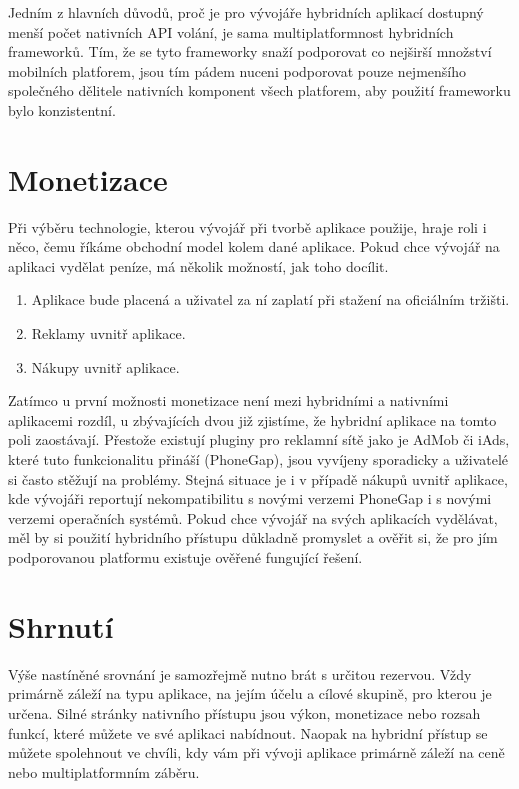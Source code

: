 Jedním z hlavních důvodů, proč je pro vývojáře hybridních aplikací dostupný menší počet nativních API volání, je sama multiplatformnost hybridních frameworků. Tím, že se tyto frameworky snaží podporovat co nejširší množství mobilních platforem, jsou tím pádem nuceni podporovat pouze nejmenšího společného dělitele nativních komponent všech platforem, aby použití frameworku bylo konzistentní.

\section{Monetizace}
Při výběru technologie, kterou vývojář při tvorbě aplikace použije, hraje roli i něco, čemu říkáme obchodní model kolem dané aplikace. Pokud chce vývojář na aplikaci vydělat peníze, má několik možností, jak toho docílit.

\begin{enumerate}
	\item Aplikace bude placená a uživatel za ní zaplatí při stažení na oficiálním tržišti.
	\item Reklamy uvnitř aplikace.
	\item Nákupy uvnitř aplikace.
\end{enumerate}

Zatímco u první možnosti monetizace není mezi hybridními a nativními aplikacemi rozdíl, u zbývajících dvou již zjistíme, že hybridní aplikace na tomto poli zaostávají. Přestože existují pluginy pro reklamní sítě jako je AdMob či iAds, které tuto funkcionalitu přináší (PhoneGap), jsou vyvíjeny sporadicky a uživatelé si často stěžují na problémy. Stejná situace je i v případě nákupů uvnitř aplikace, kde vývojáři reportují nekompatibilitu s novými verzemi PhoneGap i s novými verzemi operačních systémů. Pokud chce vývojář na svých aplikacích vydělávat, měl by si použití hybridního přístupu důkladně promyslet a ověřit si, že pro jím podporovanou platformu existuje ověřené fungující řešení.

\section{Shrnutí}
Výše nastíněné srovnání je samozřejmě nutno brát s určitou rezervou. Vždy primárně záleží na typu aplikace, na jejím účelu a cílové skupině, pro kterou je určena. Silné stránky nativního přístupu jsou výkon, monetizace nebo rozsah funkcí, které můžete ve své aplikaci nabídnout. Naopak na hybridní přístup se můžete spolehnout ve chvíli, kdy vám při vývoji aplikace primárně záleží na ceně nebo multiplatformním záběru.

